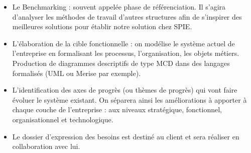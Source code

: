 \begin{itemize}
\item Le Benchmarking : souvent appelée phase de référenciation. Il s’agira d’analyser les méthodes de travail d’autres structures afin de s’inspirer des meilleures solutions pour établir notre solution chez SPIE.
\item L’élaboration de la cible fonctionnelle : on modélise le système actuel de l’entreprise en formalisant les processus, l’organisation, les objets métiers. Production de diagrammes descriptifs de type MCD dans des langages formalisés (UML ou Merise par exemple).
\item L’identification des axes de progrès (ou thèmes de progrès) qui vont faire évoluer le système existant. On séparera ainsi les améliorations à apporter à chaque couche de l’entreprise : aux niveaux stratégique, fonctionnel, organisationnel et technologique.
\item Le dossier d’expression des besoins est destiné au client et sera réaliser en collaboration avec lui.
\end{itemize}

